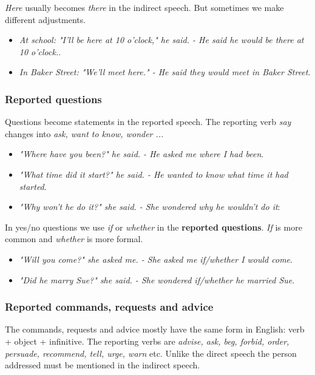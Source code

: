 \textit{Here} usually becomes \textit{there} in the indirect speech. But sometimes we make different adjustments.

\begin{itemize}
\item \textit{At school: "I'll be here at 10 o'clock," he said. - He said he would be there at 10 o'clock.}.
\item \textit{In Baker Street: "We'll meet here." - He said they would meet in Baker Street}.
\end{itemize}

\subsubsection{Reported questions}

Questions become statements in the reported speech. The reporting verb \textit{say} changes into \textit{ask, want to know, wonder ...}

\begin{itemize}

\item \textit{"Where have you been?" he said. - He asked me where I had been}.
\item \textit{"What time did it start?" he said. - He wanted to know what time it had started}.
\item \textit{"Why won't he do it?" she said. - She wondered why he wouldn't do it}:
\end{itemize}

In yes/no questions we use \textit{if} or \textit{whether} in the \textbf{reported questions}. \textit{If} is more common and \textit{whether} is more formal.

\begin{itemize}
\item \textit{"Will you come?" she asked me. - She asked me if/whether I would come}.
\item \textit{"Did he marry Sue?" she said. - She wondered if/whether he married Sue}.
\end{itemize}

\subsubsection{Reported commands, requests and advice}

The commands, requests and advice mostly have the same form in English: verb + object + infinitive. The reporting verbs are \textit{advise, ask, beg, forbid, order, persuade, recommend, tell, urge, warn} etc. Unlike the direct speech the person addressed must be mentioned in the indirect speech.

